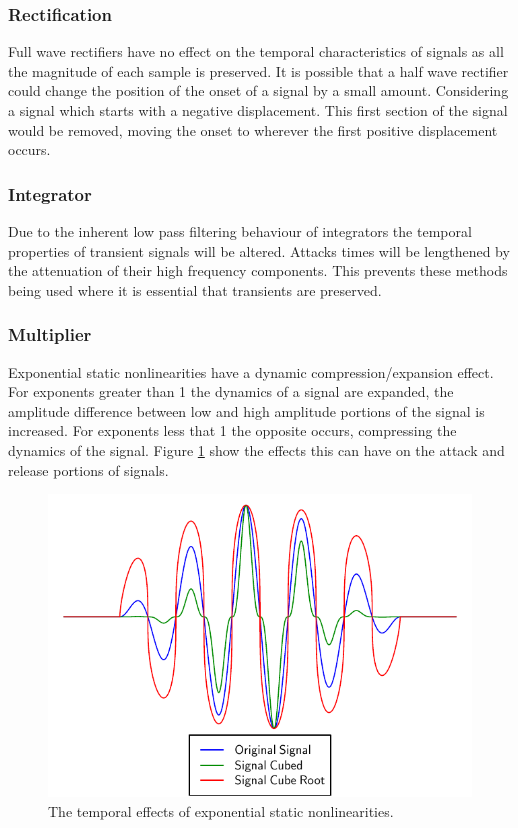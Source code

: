 		\subsubsection*{Rectification}
			Full wave rectifiers have no effect on the temporal characteristics of signals as all the magnitude
			of each sample is preserved. It is possible that a half wave rectifier could change the position of
			the onset of a signal by a small amount. Considering a signal which starts with a negative
			displacement. This first section of the signal would be removed, moving the onset to wherever the
			first positive displacement occurs.
			
		\subsubsection*{Integrator}
			Due to the inherent low pass filtering behaviour of integrators the temporal properties of
			transient signals will be altered. Attacks times will be lengthened by the attenuation of their
			high frequency components. This prevents these methods being used where it is essential that
			transients are preserved. 
			
		\subsubsection*{Multiplier}
			Exponential static nonlinearities have a dynamic compression/expansion effect. For exponents greater
			than 1 the dynamics of a signal are expanded, the amplitude difference between low and high
			amplitude portions of the signal is increased. For exponents less that 1 the opposite occurs,
			compressing the dynamics of the signal. Figure \ref{fig:ExponentiationTemporalEffects} show the
			effects this can have on the attack and release portions of signals.

			\begin{figure}[h!]
				\centering
				\includegraphics{chapter5/Images/ExponentiationTemporalEffects.pdf}
				\caption{The temporal effects of exponential static nonlinearities.}
				\label{fig:ExponentiationTemporalEffects}
			\end{figure}


